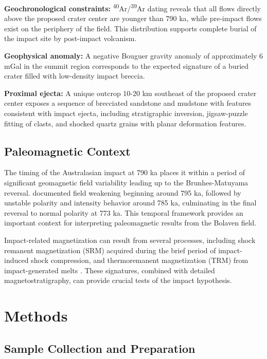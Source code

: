 \documentclass[twocolumn,11pt]{article}
\begin{document}
\textbf{Geochronological constraints:} \textsuperscript{40}Ar/\textsuperscript{39}Ar dating reveals that all flows directly above the proposed crater center are younger than 790 ka, while pre-impact flows exist on the periphery of the field. This distribution supports complete burial of the impact site by post-impact volcanism.

\textbf{Geophysical anomaly:} A negative Bouguer gravity anomaly of approximately 6 mGal in the summit region corresponds to the expected signature of a buried crater filled with low-density impact breccia.

\textbf{Proximal ejecta:} A unique outcrop 10-20 km southeast of the proposed crater center exposes a sequence of brecciated sandstone and mudstone with features consistent with impact ejecta, including stratigraphic inversion, jigsaw-puzzle fitting of clasts, and shocked quartz grains with planar deformation features.

\subsection{Paleomagnetic Context}

The timing of the Australasian impact at 790 ka places it within a period of significant geomagnetic field variability leading up to the Brunhes-Matuyama reversal. \citet{Singer2019} documented field weakening beginning around 795 ka, followed by unstable polarity and intensity behavior around 785 ka, culminating in the final reversal to normal polarity at 773 ka. This temporal framework provides an important context for interpreting paleomagnetic results from the Bolaven field.

Impact-related magnetization can result from several processes, including shock remanent magnetization (SRM) acquired during the brief period of impact-induced shock compression, and thermoremanent magnetization (TRM) from impact-generated melts \citep{Tikoo2015}. These signatures, combined with detailed magnetostratigraphy, can provide crucial tests of the impact hypothesis.

\section{Methods}

\subsection{Sample Collection and Preparation}
\end{document}
